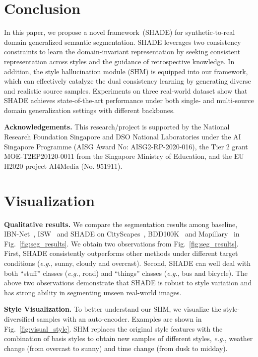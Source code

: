 \documentclass[runningheads]{llncs}
\def\eg{\emph{e.g.}} \def\Eg{\emph{E.g.}}
\newcommand{\ours}{SHADE\xspace}
\begin{document}
\section{Conclusion}
In this paper, we propose a novel framework~(\ours) for synthetic-to-real domain generalized semantic segmentation. \ours leverages two consistency constraints to learn the domain-invariant representation by seeking consistent representation across styles and the guidance of retrospective knowledge. In addition, the style hallucination module (SHM)  is equipped into our framework, which can effectively catalyze the dual consistency learning by generating diverse and realistic source samples. Experiments on three real-world dataset show that \ours achieves state-of-the-art performance under both single- and multi-source domain generalization settings with different backbones.

\noindent\textbf{Acknowledgements.}
This research/project is supported by the National Research Foundation Singapore and DSO National Laboratories under the AI Singapore Programme (AISG Award No: AISG2-RP-2020-016), the Tier 2 grant MOE-T2EP20120-0011 from the Singapore Ministry of Education, and the EU H2020 project AI4Media (No. 951911). 

\clearpage
\clearpage




\clearpage

\appendix

\section{Visualization}
\label{sec:visualization}

\noindent\textbf{Qualitative results.} We compare the segmentation results among baseline, IBN-Net~\cite{ibn}, ISW~\cite{robustnet} and \ours on CityScapes~\cite{cityscapes}, BDD100K~\cite{bdd} and Mapillary~\cite{mapillary} in Fig.~\ref{fig:seg_results}. 
We obtain two observations from Fig.~\ref{fig:seg_results}.
First, \ours consistently outperforms other methods under different target conditions (\eg, sunny, cloudy and overcast).
Second, \ours can well deal with both ``stuff'' classes (\eg, road) and ``things'' classes (\eg, bus and bicycle).
The above two observations demonstrate that \ours is robust to style variation and has strong ability in segmenting unseen real-world images.

\noindent\textbf{Style Visualization.} To better understand our SHM, we visualize the style-diversified samples with an auto-encoder.
Examples are shown in Fig.~\ref{fig:visual_style}. SHM replaces the original style features with the combination of basis styles to obtain new samples of different styles, \eg, weather change (from overcast to sunny) and time change (from dusk to midday).
\end{document}
